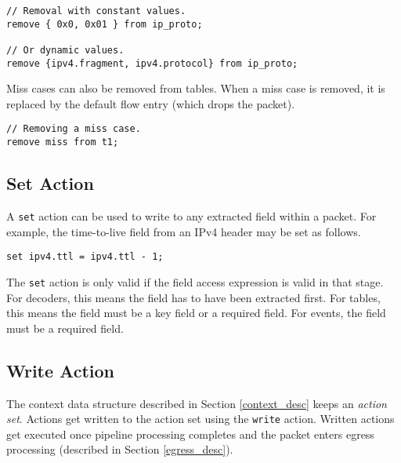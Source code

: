 \begin{codepage}
\begin{lstlisting}
// Removal with constant values.
remove { 0x0, 0x01 } from ip_proto;

// Or dynamic values.
remove {ipv4.fragment, ipv4.protocol} from ip_proto;
\end{lstlisting}
\end{codepage}

Miss cases can also be removed from tables. When a miss case is removed, it is
replaced by the default flow entry (which drops the packet).

\begin{codepage}
\begin{lstlisting}
// Removing a miss case.
remove miss from t1;
\end{lstlisting}
\end{codepage}

\subsection{Set Action} \label{tut:set_action}

A \texttt{set} action can be used to write to any extracted field within a
packet. For example, the time-to-live field from an IPv4 header may be set as
follows.

\begin{codepage}
\begin{lstlisting}
set ipv4.ttl = ipv4.ttl - 1;
\end{lstlisting}
\end{codepage}

The \texttt{set} action is only valid if the field access expression is valid in
that stage. For decoders, this means the field has to have been extracted first.
For tables, this means the field must be a key field or a required field. For
events, the field must be a required field.

\subsection{Write Action} \label{tut:write_action}

The context data structure described in Section \ref{context_desc} keeps an
\textit{action set}. Actions get written to the action set using the
\texttt{write} action. Written actions get executed once pipeline processing
completes and the packet enters egress processing (described in Section \ref{egress_desc}).

